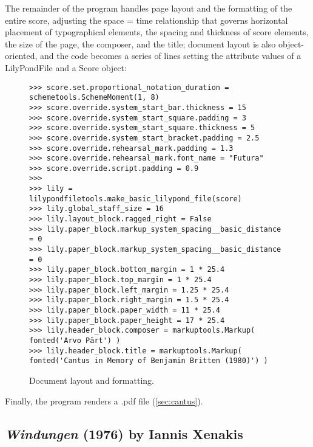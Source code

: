 The remainder of the program handles page layout and the formatting of the entire score, adjusting the space = time relationship that governs horizontal placement of typographical elements, the spacing and thickness of score elements, the size of the page, the composer, and the title; document layout is also object-oriented, and the code becomes a series of lines setting the attribute values of a LilyPondFile and a Score object:

\begin{figure}[H] 
\begin{lstlisting}[basicstyle=\scriptsize\ttfamily, breaklines=True, tabsize=4, showtabs=false, showspaces=false]
>>> score.set.proportional_notation_duration = schemetools.SchemeMoment(1, 8)
>>> score.override.system_start_bar.thickness = 15
>>> score.override.system_start_square.padding = 3
>>> score.override.system_start_square.thickness = 5
>>> score.override.system_start_bracket.padding = 2.5
>>> score.override.rehearsal_mark.padding = 1.3
>>> score.override.rehearsal_mark.font_name = "Futura"
>>> score.override.script.padding = 0.9
>>> 
>>> lily = lilypondfiletools.make_basic_lilypond_file(score)
>>> lily.global_staff_size = 16
>>> lily.layout_block.ragged_right = False
>>> lily.paper_block.markup_system_spacing__basic_distance = 0
>>> lily.paper_block.markup_system_spacing__basic_distance = 0
>>> lily.paper_block.bottom_margin = 1 * 25.4
>>> lily.paper_block.top_margin = 1 * 25.4
>>> lily.paper_block.left_margin = 1.25 * 25.4
>>> lily.paper_block.right_margin = 1.5 * 25.4
>>> lily.paper_block.paper_width = 11 * 25.4
>>> lily.paper_block.paper_height = 17 * 25.4
>>> lily.header_block.composer = markuptools.Markup( fonted('Arvo Pärt') )
>>> lily.header_block.title = markuptools.Markup( fonted('Cantus in Memory of Benjamin Britten (1980)') )\end{lstlisting}

\caption{Document layout and formatting. } 
\end{figure}

Finally, the program renders a .pdf file (\ref{sec:cantus}).
\subsection{\emph{Windungen} (1976) by Iannis Xenakis}
